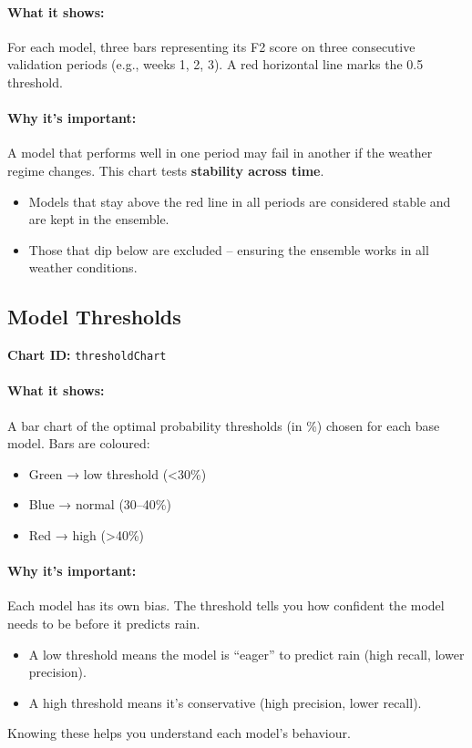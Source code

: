 \documentclass[11pt,a4paper]{article}
\begin{document}
	\paragraph{What it shows:}
	For each model, three bars representing its F2 score on three consecutive validation periods (e.g., weeks 1, 2, 3). A red horizontal line marks the 0.5 threshold.
	
	\paragraph{Why it’s important:}
	A model that performs well in one period may fail in another if the weather regime changes. This chart tests \textbf{stability across time}.
	\begin{itemize}
		\item Models that stay above the red line in all periods are considered stable and are kept in the ensemble.
		\item Those that dip below are excluded – ensuring the ensemble works in all weather conditions.
	\end{itemize}
	
	\subsection{Model Thresholds}
	\textbf{Chart ID:} \texttt{thresholdChart}
	
	\paragraph{What it shows:}
	A bar chart of the optimal probability thresholds (in \%) chosen for each base model. Bars are coloured:
	\begin{itemize}
		\item Green → low threshold (<30\%)
		\item Blue → normal (30–40\%)
		\item Red → high (>40\%)
	\end{itemize}
	
	\paragraph{Why it’s important:}
	Each model has its own bias. The threshold tells you how confident the model needs to be before it predicts rain.
	\begin{itemize}
		\item A low threshold means the model is “eager” to predict rain (high recall, lower precision).
		\item A high threshold means it’s conservative (high precision, lower recall).
	\end{itemize}
	Knowing these helps you understand each model’s behaviour.
	
\end{document}
